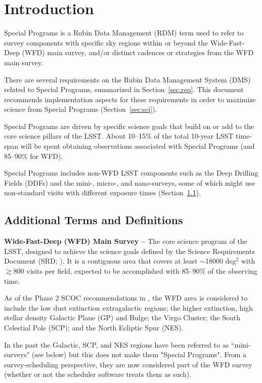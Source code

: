 \section{Introduction} \label{sec:intro}

Special Programs is a Rubin Data Management (RDM) term used to refer to survey 
components with specific sky regions within or beyond the 
Wide-Fast-Deep (WFD) main survey, and/or distinct cadences or 
strategies from the WFD main survey.

There are several requirements on the Rubin Data Management System (DMS) 
related to Special Programs, summarized in Section~\ref{sec:req}.
This document recommends implementation aspects for these requirements in order to 
maximize science from Special Programs (Section~\ref{sec:sci}).

Special Programs are driven by specific science goals that build on or 
add to the core science pillars of the LSST.
About 10--15\% of the total 10-year LSST time-span will be spent obtaining 
observations associated with Special Programs (and 85--90\% for WFD).

Special Programs includes non-WFD LSST components such as the Deep Drilling 
Fields (DDFs) and the mini-, micro-, and nano-surveys, some of which 
might use non-standard visits with different exposure times
(Section~\ref{ssec:intro_terms}).


\subsection{Additional Terms and Definitions}\label{ssec:intro_terms}

\textbf{Wide-Fast-Deep (WFD) Main Survey -- }
The core science program of the LSST, designed to achieve the science 
goals defined by the Science Requirements Document (SRD; ).
It is a contiguous area that covers at least $\sim$18000 deg$^2$ with 
$\gtrsim$800 visits per field, expected to be accomplished with 85--90\% 
of the observing time.

As of the Phase 2 SCOC recommendations in , the WFD area 
is considered to include the low dust extinction extragalactic regions; 
the higher extinction, high stellar density Galactic Plane (GP) and Bulge; the 
Virgo Cluster; the South Celestial Pole (SCP); and the North Ecliptic Spur 
(NES). 

In the past the Galactic, SCP, and NES regions have been referred to as 
``mini-surveys" (see below) but this does not make them "Special Programs". 
From a survey-scheduling perspective, they are now considered part of the 
WFD survey (whether or not the scheduler software treats them as such).

